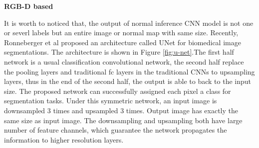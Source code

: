 \textbf{RGB-D based}


It is worth to noticed that, the output of normal inference CNN model is not one or severl labels but an entire image or normal map with same size. 
Recently, Ronneberger et al proposed an architecture called UNet \cite{unet} for biomedical image segmentations. The architecture is shown in Figure \ref{fig:u-net}.The first half network is a usual classification convolutional network, the second half replace the pooling layers and traditional fc layers in the traditional CNNs to upsampling layers, thus in the end of the second half, the output is able to back to the input size. The proposed network can successfully assigned each pixel a class for segmentation tasks. Under this symmetric network, an input image is downsampled 3 times and upsampled 3 times. Output image has exactly the same size as input image. The downsampling and upsampling both have large number of feature channels, which guarantee the network propagates the information to higher resolution layers.






